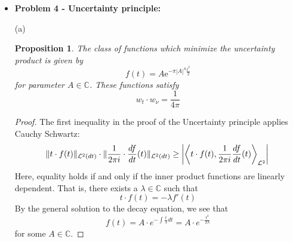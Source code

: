 \documentclass[12pt, reqno]{amsart}
\newtheorem{prop}{Proposition}[section]
\theoremstyle{definition}
\theoremstyle{remark}
\newcommand{\ud}{\mathrm{d}}
\begin{document}
\begin{itemize}
\vspace{0.2 cm}
\item {\bf{Problem 4 - Uncertainty principle:}}
\vspace{0.1 cm}


\item[(a)] 

\begin{prop}
    The class of functions which minimize the uncertainty product is given by 
    \[
        f(t)=A\mathrm{e}^{-\pi|A|^4\frac{t^2}{2}}
    \]
    for parameter $A\in\mathbb{C}$. These functions satisfy
    \[
        w_t\cdot w_\nu=\frac{1}{4\pi}
    \]
\end{prop}

\begin{proof}
    The first inequality in the proof of the Uncertainty principle applies Cauchy Schwartz: $$
    \|t\cdot f(t)\|_{\mathcal{L}^{2}(dt)}\cdot\| \frac{1}{2\pi i}\cdot \frac{df}{dt}(t)\|_{\mathcal{L}^{2}(dt)}\\
    \ge \left|\left\langle t\cdot f(t), \frac{1}{2\pi i} \frac{df}{dt}(t)\right\rangle_{\mathcal{L}^{2}}\right|\\
    $$
    Here, equality holds if and only if the inner product functions are linearly dependent. That is, there exists a $\lambda\in \mathbb{C}$ such that
    $$t\cdot f(t)=-\lambda f'(t)$$
    By the general solution to the decay equation, we see that $$
    f(t)=A\cdot e^{-\int \frac{t}{\lambda}dt}= A\cdot e^{-\frac{t^{2}}{2\lambda}}
    $$for some $A\in \mathbb{C}$. 
    

\end{proof}
\end{itemize}
\end{document}
